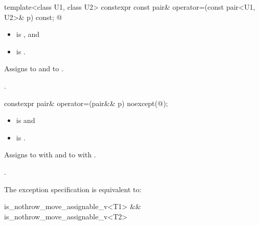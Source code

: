 \documentclass{wg21}
\begin{document}
%
\begin{itemdecl}
template<class U1, class U2> constexpr const pair& operator=(const pair<U1, U2>& p) const;
@
\end{itemdecl}

\begin{itemdescr}
    
    
    \pnum
    \constraints
    \begin{itemize}
        \item
         is , and
        \item
         is .
    \end{itemize}
    
    \pnum
    \effects
    
    Assigns  to  and
     to .
    
    \pnum
    \returns
    .
\end{itemdescr}

%
\begin{itemdecl}
    constexpr pair& operator=(pair&& p) noexcept(@\seebelow@);
\end{itemdecl}

\begin{itemdescr}
    \pnum
    \constraints
    \begin{itemize}
        \item {} is  and
        \item {} is .
    \end{itemize}
    
    \pnum
    \effects
    Assigns to  with 
    and to  with .
    
    \pnum
    \returns
    .
    
    \pnum
    \remarks
    The exception specification is equivalent to:
    \begin{codeblock}
        is_nothrow_move_assignable_v<T1> && is_nothrow_move_assignable_v<T2>
    \end{codeblock}
\end{itemdescr}
\end{document}
